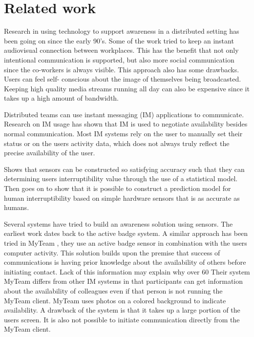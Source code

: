 \documentclass{sigchi}
\begin{document}
\section{Related work}
Research in using technology to support awareness in a distributed setting has been going on since the early 90’s. Some of the work\cite{bly1993media}\cite{gaver1992realizing}\cite{mantei1991experiences} tried to keep an instant audiovisual connection between workplaces. This has the benefit that not only intentional communication is supported, but also more social communication since the co-workers is always visible. This approach also has some drawbacks. Users can feel self- conscious about the image of themselves being broadcasted. Keeping high quality media streams running all day can also be expensive since it takes up a high amount of bandwidth.

Distributed teams can use instant messaging (IM) applications to communicate. Research on IM usage \cite{nardi2000interaction}\cite{handel2002chat}\cite{tang2001connexus} has shown that IM is used to negotiate availability besides normal communication. Most IM systems rely on the user to manually set their status or on the users activity data, which does not always truly reflect the precise availability of the user.

\cite{fogarty2004examining} Shows that sensors can be constructed so satisfying accuracy such that they can determining users interruptibility value through the use of a statistical model. \cite{Fogarty:2005:PHI:1057237.1057243} Then goes on to show that it is possible to construct a prediction model for human interruptibility based on simple hardware sensors that is as accurate as humans.

Several systems have tried to build an awareness solution using sensors. The earliest work dates back to the active badge system\cite{want1992active}. A similar approach has been tried in MyTeam \cite{lai2003myteam}, they use an active badge sensor in combination with the users computer activity. This solution builds upon the premise that success of communications is having prior knowledge about the availability of others before initiating contact. Lack of this information may explain why over 60%
Their system MyTeam differs from other IM systems in that participants can get information about the availability of colleagues even if that person is not running the MyTeam client. MyTeam uses photos on a colored background to indicate availability. A drawback of the system is that it takes up a large portion of the users screen. It is also not possible to initiate communication directly from the MyTeam client.
\end{document}
